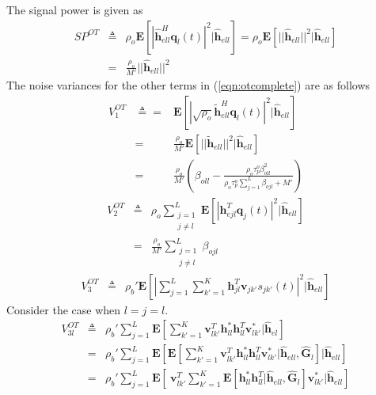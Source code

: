 \documentclass[10pt, a4paper, twoside,fleqn]{article}
\begin{document}
The signal power is given as
\begin{eqnarray}
SP^{OT} &\triangleq& \rho_o\pmb{E}[|\pmb{\hat h}_{ell}^H \pmb{q}_l(t)|^2 | \pmb{\hat h}_{ell}] = \rho_o\pmb{E}[||\pmb{\hat h}_{ell}||^2 | \pmb{\hat h}_{ell}] \nonumber \\     &=& \frac{\rho_o}{M'} ||\pmb{\hat h}_{ell}||^2
\end{eqnarray}
The noise variances for the other terms in (\ref{eqn:otcomplete}) are as follows
\begin{eqnarray}\label{eqn:otv1}
	V_1^{OT} &\triangleq=& \pmb{E}[|\sqrt{\rho_o}\pmb{\widetilde{h}}_{ell}^H \pmb{q}_l(t)|^2|\pmb{\hat h}_{ell}] \nonumber \\
            &=& \frac{\rho_o}{M'} \pmb{E}[||\pmb{\widetilde{h}}_{ell}||^2 |\pmb{\hat h}_{ell}] \nonumber \\
            &=& \frac{\rho_o}{M'}\left(\beta_{oll}-\frac{\rho_o\tau_p^o\beta^2_{oll}}{\rho_o\tau_p^o\sum\limits_{j=1}^{L}\beta_{ojl}+M'}\right)          
\end{eqnarray}
\begin{eqnarray}\label{eqn:otv2}
	V_2^{OT} &\triangleq& \rho_o \sum_{\substack{j=1 \\ j \neq l}}^{L} \pmb{E}[|\pmb{h}^T_{ejl} \pmb{q}_j(t)|^2|\pmb{\hat h}_{ell}] \nonumber \\
            &=& \frac{\rho_o}{M'} \sum_{\substack{j=1 \\ j\neq l}}^{L} \beta_{ojl}
\end{eqnarray}
\begin{eqnarray}\label{eqn:v3ot}
	V_3^{OT} &\triangleq& \rho_b' \pmb{E}\left[\left| \sum_{j=1}^{L}\sum_{k'=1}^{K} \pmb{h}^T_{jl} \pmb{v}_{jk'}s_{jk'}(t) \right|^2 | \pmb{\hat h}_{ell} \right] 
\end{eqnarray}
Consider the case when $l=j=l$.
\begin{eqnarray}
     V_{3l}^{OT} &\triangleq& \rho_b' \sum_{j=1}^{L} \pmb{E}\left[\sum_{k'=1}^{K} \pmb{v}_{lk'}^T \pmb{h}_{ll}^*  \pmb{h}_{ll}^T \pmb{v}_{lk'}^*| \pmb{\hat h}_{el} \right] \nonumber \\
            &=& \rho_b' \sum_{j=1}^{L} \pmb{E}\left[\pmb{E}\left[\sum_{k'=1}^{K} \pmb{v}^T_{lk'} \pmb{h}_{ll}^*  \pmb{h}_{ll}^T \pmb{v}_{lk'}^*| \pmb{\hat h}_{ell},  \pmb{\hat G}_{l} \right] | \pmb{\hat h}_{ell}\right] \nonumber \\
            &=& \rho_b' \sum_{j=1}^{L} \pmb{E}\left[\ \pmb{v}^T_{lk'}\sum_{k'=1}^{K} \pmb{E}\left[ \pmb{h}_{ll}^*  \pmb{h}^T_{ll} | \pmb{\hat h}_{ell},  \pmb{\hat G}_{l} \right] \pmb{v}_{lk'}^*| \pmb{\hat h}_{ell}\right]
\end{eqnarray}
\end{document}
